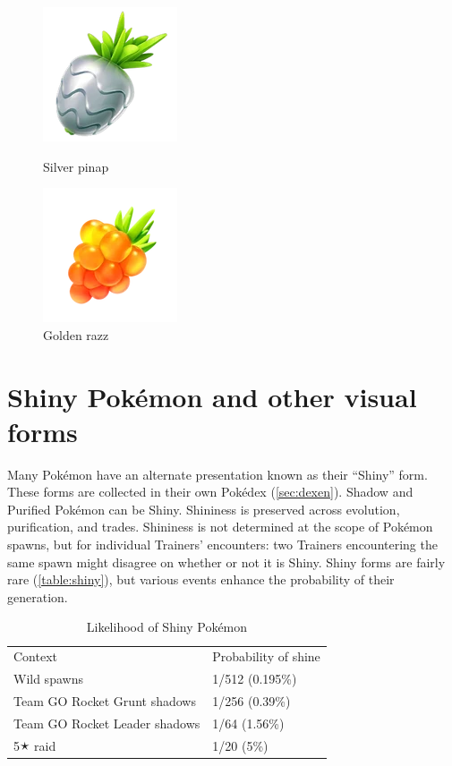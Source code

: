 \begin{figure}[h!]
  \begin{minipage}[t]{0.5\textwidth}
    \begin{center}
    \includegraphics[scale=.4]{images/silverpinap.png}
    \end{center}
    \caption[Silver pinap berry]{Silver pinap}
    \label{fig:silverpinap}
  \end{minipage}
  \begin{minipage}[t]{0.5\textwidth}
    \begin{center}
    \includegraphics[scale=.4]{images/goldenrazz.png}
    \end{center}
    \caption[Golden razz berry]{Golden razz}
    \label{fig:goldenrazz}
  \end{minipage}
\end{figure}

\section{Shiny Pokémon and other visual forms}
\label{sec:shiny}
Many Pokémon have an alternate presentation known as their ``Shiny'' form.
These forms are collected in their own Pokédex (\autoref{sec:dexen}).
Shadow and Purified Pokémon can be Shiny.
Shininess is preserved across evolution, purification, and trades.
Shininess is not determined at the scope of Pokémon spawns, but for individual
  Trainers' encounters: two Trainers encountering the same spawn might disagree
  on whether or not it is Shiny.
Shiny forms are fairly rare (\autoref{table:shiny}), but various events
  enhance the probability of their generation.
\begin{table}[ht]
\begin{center}
\begin{tabular}{ll}
Context & Probability of shine \\
\Midrule
  Wild spawns & 1/512 (0.195\%) \\
  Team GO Rocket Grunt shadows & 1/256 (0.39\%) \\
  Team GO Rocket Leader shadows & 1/64 (1.56\%) \\
  5🟉 raid & 1/20 (5\%) \\
\end{tabular}
\end{center}
\caption{Likelihood of Shiny Pokémon}
\label{table:shiny}
\end{table}

